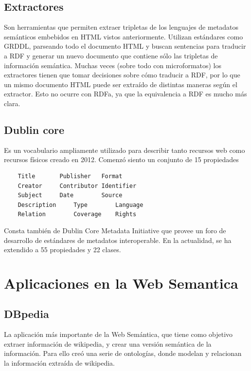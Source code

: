 \subsection{Extractores}

Son herramientas que permiten extraer tripletas de los lenguajes de metadatos semánticos embebidos en HTML vistos anteriormente. 
Utilizan estándares como GRDDL, parseando todo el documento HTML y buscan sentencias para traducir a RDF y generar un nuevo documento 
que contiene sólo las tripletas de información semántica. 
Muchas veces (sobre todo con microformatos) los extractores tienen que tomar decisiones sobre cómo traducir a RDF, por lo que 
un mismo documento HTML puede ser extraído de distintas maneras según el extractor. Esto no ocurre con RDFa, ya que la equivalencia a RDF es mucho 
más clara.

\subsection{Dublin core}

Es un vocabulario ampliamente utilizado para describir tanto recursos web como recursos físicos creado en 2012. Comenzó siento un conjunto de 15 
propiedades 

\begin{lstlisting}
    Title		Publisher	Format
    Creator		Contributor	Identifier
    Subject		Date		Source
    Description		Type		Language
    Relation		Coverage	Rights
\end{lstlisting}



Consta también de Dublin Core Metadata Initiative que provee un foro de desarrollo de estándares de metadatos interoperable.
En la actualidad, se ha extendido a 55 propiedades y 22 clases.



\section{Aplicaciones en la Web Semantica}

\subsection{DBpedia}

La aplicación más importante de la Web Semántica, que tiene como objetivo extraer información de wikipedia, y crear una versión semántica 
de la información. Para ello creó una serie de ontologías, donde modelan y relacionan la información extraída de wikipedia.

